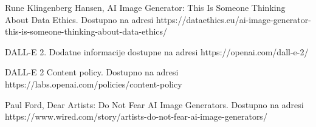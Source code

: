 \documentclass[12pt, letterpaper]{article}
\begin{document}
\begin{thebibliography}{10}
 Rune Klingenberg Hansen, AI Image Generator: This Is Someone Thinking About Data Ethics. Dostupno na adresi https://dataethics.eu/ai-image-generator-this-is-someone-thinking-about-data-ethics/

 DALL-E 2. Dodatne informacije dostupne na adresi https://openai.com/dall-e-2/

 DALL-E 2 Content policy. Dostupno na adresi https://labs.openai.com/policies/content-policy

 Paul Ford, Dear Artists: Do Not Fear AI Image Generators. Dostupno na adresi https://www.wired.com/story/artists-do-not-fear-ai-image-generators/

\end{thebibliography}
\end{document}
